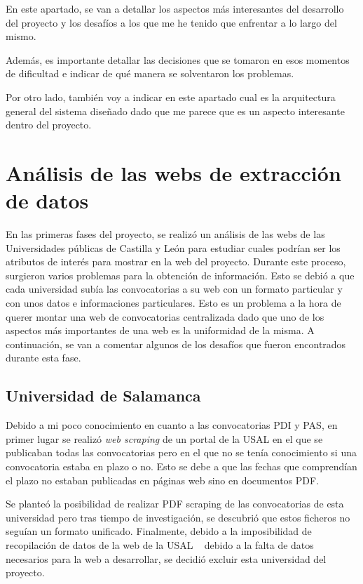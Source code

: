 
En este apartado, se van a detallar los aspectos más interesantes del desarrollo del proyecto y los desafíos a los que me he tenido que enfrentar a lo largo del mismo. 

Además, es importante detallar las decisiones que se tomaron en esos momentos de dificultad e indicar de qué manera se solventaron los problemas.

Por otro lado, también voy a indicar en este apartado cual es la arquitectura general del sistema diseñado dado que me parece que es un aspecto interesante dentro del proyecto.

\section{Análisis de las webs de extracción de datos}
En las primeras fases del proyecto, se realizó un análisis de las webs de las Universidades públicas de Castilla y León para estudiar cuales podrían ser los atributos de interés para mostrar en la web del proyecto. Durante este proceso, surgieron varios problemas para la obtención de información. Esto se debió a que cada universidad subía las convocatorias a su web con un formato particular y con unos datos e informaciones particulares. Esto es un problema a la hora de querer montar una web de convocatorias centralizada dado que uno de los aspectos más importantes de una web es la uniformidad de la misma. A continuación, se van a comentar algunos de los desafíos que fueron encontrados durante esta fase.

\subsection{Universidad de Salamanca}
Debido a mi poco conocimiento en cuanto a las convocatorias PDI y PAS, en primer lugar se realizó \textit{web scraping} de un portal de la USAL en el que se publicaban todas las convocatorias pero en el que no se tenía conocimiento si una convocatoria estaba en plazo o no. Esto se debe a que las fechas que comprendían el plazo no estaban publicadas en páginas web sino en documentos PDF. 

Se planteó la posibilidad de realizar PDF scraping de las convocatorias de esta universidad pero tras tiempo de investigación, se descubrió que estos ficheros no seguían un formato unificado.  Finalmente, debido a la imposibilidad de recopilación de datos de la web de la USAL ~\cite{usal:latex} debido a la falta de datos necesarios para la web a desarrollar, se decidió excluir esta universidad del proyecto.

